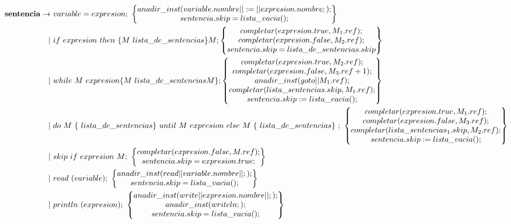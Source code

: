 \documentclass[12pt,a4paper, landscape]{article}
\theoremstyle{mytheor}
\begin{document}
\begin{alignat*}{2}
  \text{\textbf{sentencia}} \to\ & variable = expresion;\ \begin{Bmatrix} anadir\_inst(variable.nombre||:=||expresion.nombre;);\\ sentencia.skip=lista\_vacia();\end{Bmatrix}\\
 |\ &if\ expresion\ then\ \{M\ lista\_de\_sentencias\}M; \begin{Bmatrix} completar(expresion.true,M_1.ref); \\ completar(expresion.false,M_2.ref);\\ sentencia.skip=lista\_de\_sentencias.skip \end{Bmatrix} \\
 |\ &while\ M\ expresion \{M\ lista\_de\_sentencias M\}; \begin{Bmatrix} completar(expresion.true,M_2.ref); \\ completar(expresion.false,M_3.ref+1);\\ anadir\_inst(goto||M_1.ref);\\completar(lista\_sentencias.skip,M_1.ref);\\sentencia.skip:=lista\_vacia(); \end{Bmatrix} \\
 |\ &do\ M\ \{\ lista\_de\_sentencias \}\ until\ M\ expresion\ else\ M\ \{\ lista\_de\_sentencias\}\ ;\ \begin{Bmatrix} completar(expresion.true,M_1.ref); \\ completar(expresion.false,M_3.ref);\\ completar(lista\_sentencias_1.skip,M_2.ref);\\sentencia.skip:=lista\_vacia(); \end{Bmatrix} \\
 |\ &skip\ if\ expresion\ M;\ \begin{Bmatrix} completar(expresion.false,M.ref); \\ sentencia.skip =expresion.true; \end{Bmatrix}\\
 |\ &read\ (variable);\ \begin{Bmatrix} anadir\_inst(read||variable.nombre||;);\\ sentencia.skip=lista\_vacia();\end{Bmatrix}\\
 |\ &println \ (expresion);\  \begin{Bmatrix} anadir\_inst(write||expresion.nombre||;); \\ anadir\_inst(writeln;); \\ sentencia.skip=lista\_vacia(); \end{Bmatrix}\\
\end{alignat*}
\end{document}
